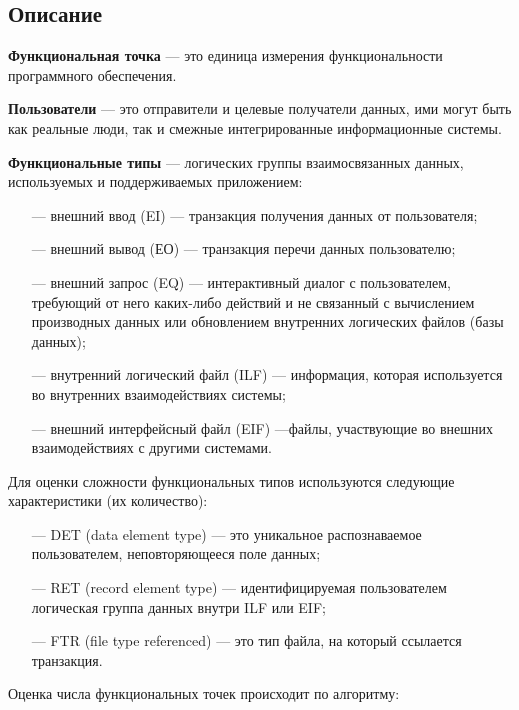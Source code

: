 \subsection*{Описание}

\textbf{Функциональная точка} --- это единица измерения функциональности программного
обеспечения.

\textbf{Пользователи} --- это отправители и целевые получатели данных, ими могут быть как реальные люди, так и смежные интегрированные информационные системы.

\textbf{Функциональные типы} — логических группы взаимосвязанных данных, используемых и поддерживаемых приложением:

\begin{itemize}
    \item[---] внешний ввод (EI) --- транзакция получения данных от пользователя;
    \item[---] внешний вывод (ЕО) ---  транзакция перечи данных пользователю;
    \item[---] внешний запрос (EQ) ---  интерактивный диалог с пользователем, требующий от него каких-либо действий и не связанный с вычислением производных данных или обновлением внутренних логических файлов (базы данных);
    \item[---] внутренний логический файл (ILF) --- информация, которая используется во внутренних взаимодействиях системы;
    \item[---] внешний интерфейсный файл (EIF) ---файлы, участвующие во внешних взаимодействиях с другими системами.
\end{itemize}

Для оценки сложности функциональных типов используются следующие характеристики (их количество):

\begin{itemize}
    \item[---] DET (data element type) --- это уникальное распознаваемое пользователем, неповторяющееся поле данных;
    \item[---] RET (record element type) --- идентифицируемая пользователем логическая группа данных внутри ILF или EIF;
    \item[---] FTR (file type referenced) --- это тип файла, на который ссылается транзакция.
\end{itemize}

Оценка числа функциональных точек происходит по алгоритму:

